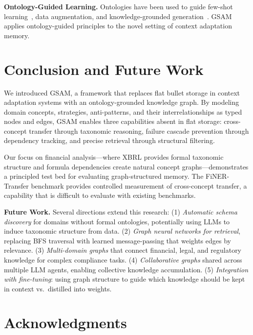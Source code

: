 \documentclass[12pt,a4paper]{article}
\begin{document}
\textbf{Ontology-Guided Learning.} Ontologies have been used to guide few-shot learning~\cite{wang2021logic}, data augmentation, and knowledge-grounded generation~\cite{liu2024kg}. GSAM applies ontology-guided principles to the novel setting of context adaptation memory.


\section{Conclusion and Future Work}
\label{sec:conclusion}

We introduced GSAM, a framework that replaces flat bullet storage in context adaptation systems with an ontology-grounded knowledge graph. By modeling domain concepts, strategies, anti-patterns, and their interrelationships as typed nodes and edges, GSAM enables three capabilities absent in flat storage: cross-concept transfer through taxonomic reasoning, failure cascade prevention through dependency tracking, and precise retrieval through structural filtering.

Our focus on financial analysis---where XBRL provides formal taxonomic structure and formula dependencies create natural concept graphs---demonstrates a principled test bed for evaluating graph-structured memory. The FiNER-Transfer benchmark provides controlled measurement of cross-concept transfer, a capability that is difficult to evaluate with existing benchmarks.

\textbf{Future Work.} Several directions extend this research: (1) \textit{Automatic schema discovery} for domains without formal ontologies, potentially using LLMs to induce taxonomic structure from data. (2) \textit{Graph neural networks for retrieval}, replacing BFS traversal with learned message-passing that weights edges by relevance. (3) \textit{Multi-domain graphs} that connect financial, legal, and regulatory knowledge for complex compliance tasks. (4) \textit{Collaborative graphs} shared across multiple LLM agents, enabling collective knowledge accumulation. (5) \textit{Integration with fine-tuning}: using graph structure to guide which knowledge should be kept in context vs.\ distilled into weights.


\section*{Acknowledgments}
\end{document}

